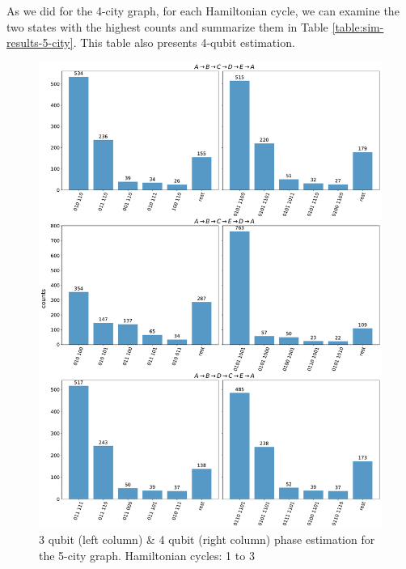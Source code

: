 \documentclass[msc,oneside]{ubcthesis}
\begin{document}
	As we did for the 4-city graph, for each Hamiltonian cycle, we can examine the two states with the highest counts and summarize them in Table \ref{table:sim-results-5-city}. This table also presents 4-qubit estimation.
	
		\begin{figure}[!h]
		\centering
		\includegraphics[width=\textwidth,height=0.9\textheight,keepaspectratio]{"graphics/1-3-5city"}
		\caption{3 qubit (left column) \& 4 qubit (right column) phase estimation for the 5-city graph. Hamiltonian cycles: 1 to 3}
		\label{fig:5-city-1-3}
	\end{figure}		
	
\end{document}
